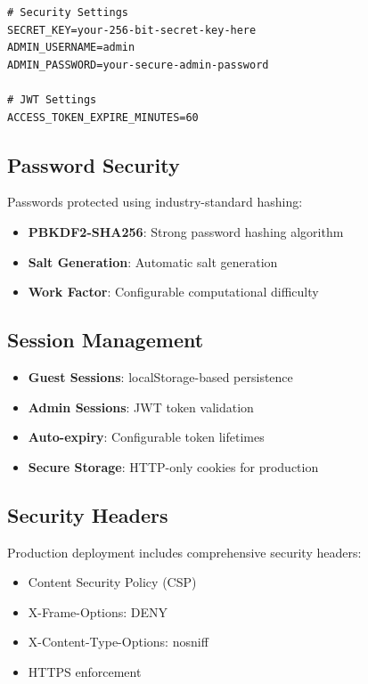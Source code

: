 \documentclass[11pt,a4paper]{article}
\begin{document}
\begin{lstlisting}[caption=.env Configuration]
# Security Settings
SECRET_KEY=your-256-bit-secret-key-here
ADMIN_USERNAME=admin
ADMIN_PASSWORD=your-secure-admin-password

# JWT Settings
ACCESS_TOKEN_EXPIRE_MINUTES=60
\end{lstlisting}

\subsection{Password Security}

Passwords protected using industry-standard hashing:

\begin{itemize}
    \item \textbf{PBKDF2-SHA256}: Strong password hashing algorithm
    \item \textbf{Salt Generation}: Automatic salt generation
    \item \textbf{Work Factor}: Configurable computational difficulty
\end{itemize}

\subsection{Session Management}

\begin{itemize}
    \item \textbf{Guest Sessions}: localStorage-based persistence
    \item \textbf{Admin Sessions}: JWT token validation
    \item \textbf{Auto-expiry}: Configurable token lifetimes
    \item \textbf{Secure Storage}: HTTP-only cookies for production
\end{itemize}

\subsection{Security Headers}

Production deployment includes comprehensive security headers:

\begin{itemize}
    \item Content Security Policy (CSP)
    \item X-Frame-Options: DENY
    \item X-Content-Type-Options: nosniff
    \item HTTPS enforcement
\end{itemize}
\end{document}
